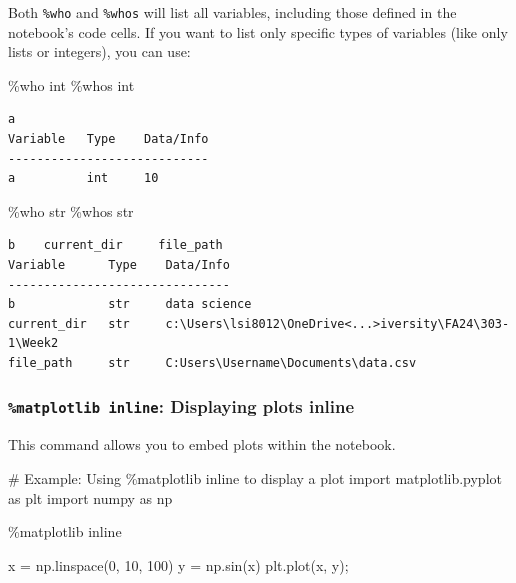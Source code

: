 \documentclass[
  letterpaper,
  DIV=11,
  numbers=noendperiod]{scrreprt}
\newenvironment{Shaded}{\begin{snugshade}}{\end{snugshade}}
\newcommand{\BuiltInTok}[1]{\textcolor[rgb]{0.00,0.23,0.31}{#1}}
\newcommand{\CommentTok}[1]{\textcolor[rgb]{0.37,0.37,0.37}{#1}}
\newcommand{\DecValTok}[1]{\textcolor[rgb]{0.68,0.00,0.00}{#1}}
\newcommand{\ImportTok}[1]{\textcolor[rgb]{0.00,0.46,0.62}{#1}}
\newcommand{\NormalTok}[1]{\textcolor[rgb]{0.00,0.23,0.31}{#1}}
\newcommand{\OperatorTok}[1]{\textcolor[rgb]{0.37,0.37,0.37}{#1}}
\begin{document}
Both \texttt{\%who} and \texttt{\%whos} will list all variables,
including those defined in the notebook's code cells. If you want to
list only specific types of variables (like only lists or integers), you
can use:

\begin{Shaded}
\begin{Highlighting}[]
\OperatorTok{\%}\NormalTok{who }\BuiltInTok{int}
\OperatorTok{\%}\NormalTok{whos }\BuiltInTok{int}
\end{Highlighting}
\end{Shaded}

\begin{verbatim}
a    
Variable   Type    Data/Info
----------------------------
a          int     10
\end{verbatim}

\begin{Shaded}
\begin{Highlighting}[]
\OperatorTok{\%}\NormalTok{who }\BuiltInTok{str}
\OperatorTok{\%}\NormalTok{whos }\BuiltInTok{str}
\end{Highlighting}
\end{Shaded}

\begin{verbatim}
b    current_dir     file_path   
Variable      Type    Data/Info
-------------------------------
b             str     data science
current_dir   str     c:\Users\lsi8012\OneDrive<...>iversity\FA24\303-1\Week2
file_path     str     C:Users\Username\Documents\data.csv
\end{verbatim}

\hypertarget{matplotlib-inline-displaying-plots-inline}{%
\subsubsection{\texorpdfstring{\texttt{\%matplotlib\ inline}: Displaying
plots
inline}{\%matplotlib inline: Displaying plots inline}}\label{matplotlib-inline-displaying-plots-inline}}

This command allows you to embed plots within the notebook.

\begin{Shaded}
\begin{Highlighting}[]
\CommentTok{\# Example: Using \%matplotlib inline to display a plot}
\ImportTok{import}\NormalTok{ matplotlib.pyplot }\ImportTok{as}\NormalTok{ plt}
\ImportTok{import}\NormalTok{ numpy }\ImportTok{as}\NormalTok{ np}

\OperatorTok{\%}\NormalTok{matplotlib inline}

\NormalTok{x }\OperatorTok{=}\NormalTok{ np.linspace(}\DecValTok{0}\NormalTok{, }\DecValTok{10}\NormalTok{, }\DecValTok{100}\NormalTok{)}
\NormalTok{y }\OperatorTok{=}\NormalTok{ np.sin(x)}
\NormalTok{plt.plot(x, y)}\OperatorTok{;}
\end{Highlighting}
\end{Shaded}
\end{document}
